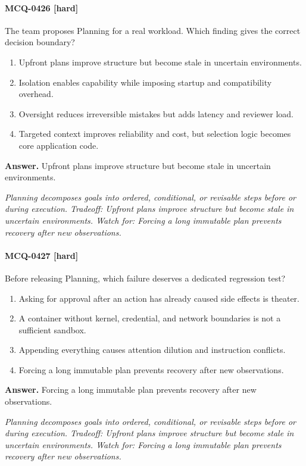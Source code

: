 \paragraph{MCQ-0426 [hard]} The team proposes Planning for a real workload. Which finding gives the correct decision boundary?
\begin{enumerate}[label=\Alph*.]
\item Upfront plans improve structure but become stale in uncertain environments.
\item Isolation enables capability while imposing startup and compatibility overhead.
\item Oversight reduces irreversible mistakes but adds latency and reviewer load.
\item Targeted context improves reliability and cost, but selection logic becomes core application code.
\end{enumerate}
\noindent\textbf{Answer.} Upfront plans improve structure but become stale in uncertain environments.
\par\textit{Planning decomposes goals into ordered, conditional, or revisable steps before or during execution. Tradeoff: Upfront plans improve structure but become stale in uncertain environments. Watch for: Forcing a long immutable plan prevents recovery after new observations.}
\paragraph{MCQ-0427 [hard]} Before releasing Planning, which failure deserves a dedicated regression test?
\begin{enumerate}[label=\Alph*.]
\item Asking for approval after an action has already caused side effects is theater.
\item A container without kernel, credential, and network boundaries is not a sufficient sandbox.
\item Appending everything causes attention dilution and instruction conflicts.
\item Forcing a long immutable plan prevents recovery after new observations.
\end{enumerate}
\noindent\textbf{Answer.} Forcing a long immutable plan prevents recovery after new observations.
\par\textit{Planning decomposes goals into ordered, conditional, or revisable steps before or during execution. Tradeoff: Upfront plans improve structure but become stale in uncertain environments. Watch for: Forcing a long immutable plan prevents recovery after new observations.}
